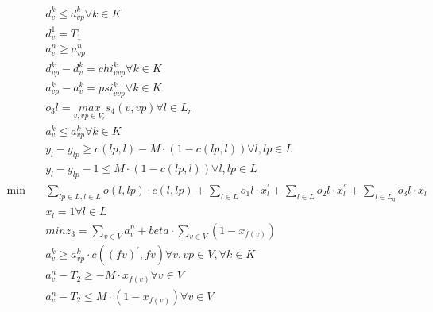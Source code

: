 \begin{align}
  &  d_{v}^{k} \leq d_{vp}^{k} \forall k \in K  \tag{eq\_0040} \\
  &  d_{v}^{1} = T_{1}  \tag{eq\_0041} \\
  &  a_{v}^{n} \geq a_{vp}^{n}  \tag{eq\_0042} \\
  &  d_{vp}^{k} - d_{v}^{k} = \mathit{chi}_{v vp}^{k} \forall k \in K  \tag{eq\_0043} \\
  &  a_{vp}^{k} - a_{v}^{k} = \mathit{psi}_{v vp}^{k} \forall k \in K  \tag{eq\_0044} \\
  &  o_{3} l = \underset{v , vp \in V_{r}}{max} s_{4} \left(v , vp\right) \forall l \in L_{r}  \tag{eq\_0045} \\
  &  a_{v}^{k} \leq a_{vp}^{k} \forall k \in K  \tag{eq\_0046} \\
  &  y_{l} - y_{lp} \geq c \left(lp , l\right) - M \cdot \left(1 - c \left(lp , l\right)\right) \forall l , lp \in L  \tag{eq\_0047} \\
  &  y_{l} - y_{lp} - 1 \leq M \cdot \left(1 - c \left(lp , l\right)\right) \forall l , lp \in L  \tag{eq\_0048} \\
  \min\quad & \sum_{lp \in L, l \in L} o \left(l , lp\right) \cdot c \left(l , lp\right) + \sum_{l \in L} o_{1} l \cdot x_{l}^{'} + \sum_{l \in L} o_{2} l \cdot x_{l}^{''} + \sum_{l \in L_{g}} o_{3} l \cdot x_{l} \tag{eq\_0049} \\
  &  x_{l} = 1 \forall l \in L  \tag{eq\_0050} \\
  &  \mathit{min} z_{3} = \sum_{v \in V} a_{v}^{n} + \mathit{beta} \cdot \sum_{v \in V} \left(1 - x_{f \left(v\right)}\right)  \tag{eq\_0051} \\
  &  a_{v}^{k} \geq a_{vp}^{k} \cdot c \left(\left(f v\right)^{'} , f v\right) \forall v , vp \in V , \forall k \in K  \tag{eq\_0052} \\
  &  a_{v}^{n} - T_{2} \geq - M \cdot x_{f \left(v\right)} \forall v \in V  \tag{eq\_0053} \\
  &  a_{v}^{n} - T_{2} \leq M \cdot \left(1 - x_{f \left(v\right)}\right) \forall v \in V  \tag{eq\_0054} \\
\end{align}
